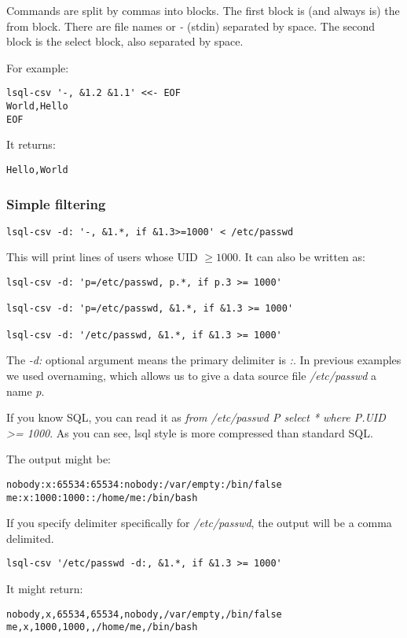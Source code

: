 Commands are split by commas into blocks. The first block is (and always is) the from block. There are file names or \textit{-} (stdin) separated by space. The second block is the select block, also separated by space.

For example:
\begin{verbatim}
lsql-csv '-, &1.2 &1.1' <<- EOF
World,Hello
EOF
\end{verbatim}
It returns:
\begin{verbatim}
Hello,World
\end{verbatim}


\subsubsection{Simple filtering}

\begin{verbatim}
lsql-csv -d: '-, &1.*, if &1.3>=1000' < /etc/passwd
\end{verbatim}
This will print lines of users whose UID $\geq 1000$. It can also be written as:
\begin{verbatim}
lsql-csv -d: 'p=/etc/passwd, p.*, if p.3 >= 1000'
    
lsql-csv -d: 'p=/etc/passwd, &1.*, if &1.3 >= 1000'

lsql-csv -d: '/etc/passwd, &1.*, if &1.3 >= 1000'
\end{verbatim}
The \textit{-d:} optional argument means the primary delimiter is \textit{:}. In previous examples we used overnaming, which allows us to give a data source file \textit{/etc/passwd} a name \textit{p}.

If you know SQL, you can read it as \textit{from /etc/passwd P select * where P.UID \textgreater= 1000}. As you can see, lsql style is more compressed than standard SQL.

The output might be:
\begin{verbatim}
nobody:x:65534:65534:nobody:/var/empty:/bin/false
me:x:1000:1000::/home/me:/bin/bash
\end{verbatim}

If you specify delimiter specifically for \textit{/etc/passwd}, the output will be a comma delimited.
\begin{verbatim}
lsql-csv '/etc/passwd -d:, &1.*, if &1.3 >= 1000'
\end{verbatim}
It might return:
\begin{verbatim}
nobody,x,65534,65534,nobody,/var/empty,/bin/false
me,x,1000,1000,,/home/me,/bin/bash
\end{verbatim}


